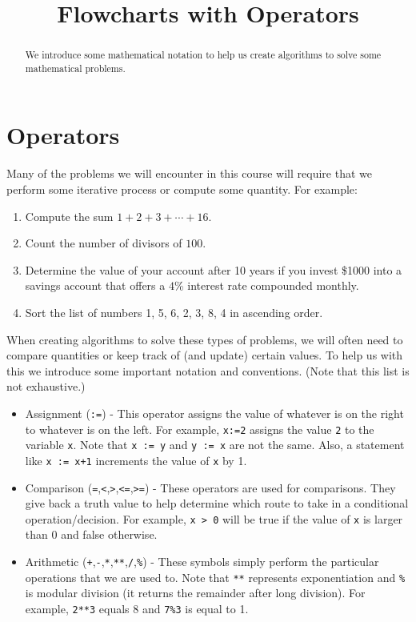 \documentclass{ximera}
\title{Flowcharts with Operators}
\begin{document}
\begin{abstract}
We introduce some mathematical notation to help us create algorithms to solve some mathematical problems.
\end{abstract}
\maketitle

\section{Operators}
Many of the problems we will encounter in this course will require that we perform some iterative process or compute some quantity. For example:

\begin{enumerate}
	\item Compute the sum $1+2+3+\cdots+16$.
	\item Count the number of divisors of $100$.
	\item Determine the value of your account after 10 years if you invest \$1000 into a savings account that offers a $4$\% interest rate compounded monthly.
	\item Sort the list of numbers 1, 5, 6, 2, 3, 8, 4 in ascending order.
\end{enumerate}

When creating algorithms to solve these types of problems, we will often need to compare quantities or keep track of (and update) certain values. To help us with this we introduce some important notation and conventions. (Note that this list is not exhaustive.)

\begin{itemize}
	\item Assignment (\verb|:=|) - This operator assigns the value of whatever is on the right to whatever is on the left. For example, \verb|x:=2| assigns the value \verb|2| to the variable \verb|x|. Note that \verb|x := y| and \verb|y := x| are not the same. Also, a statement like \verb|x := x+1| increments the value of \verb|x| by 1.
	\item Comparison (\verb|=|,\verb|<|,\verb|>|,\verb|<=|,\verb|>=|) - These operators are used for comparisons. They give back a truth value to help determine which route to take in a conditional operation/decision. For example, \verb|x > 0| will be true if the value of \verb|x| is larger than 0 and false otherwise.
		\item Arithmetic (\verb|+|,\verb|-|,\verb|*|,\verb|**|,\verb|/|,\verb|%|) - These symbols simply perform the particular operations that we are used to. Note that \verb|**| represents exponentiation and \verb|%| is modular division (it returns the remainder after long division). For example, \verb|2**3| equals 8 and \verb|7%3| is equal to 1.
\end{itemize}
\end{document}
